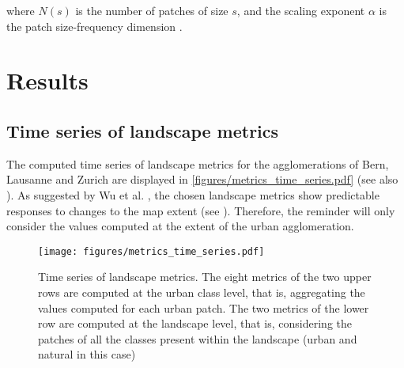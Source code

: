 \documentclass[10pt,letterpaper]{article}
\begin{document}
where $N(s)$ is the number of patches of size $s$, and the scaling exponent $\alpha$ is the patch size-frequency dimension \cite{white1993cellular}.



\section*{Results}

\subsection*{Time series of landscape metrics}

The computed time series of landscape metrics for the agglomerations of Bern, Lausanne and Zurich are displayed in \autoref{figures/metrics_time_series.pdf} (see also ).
As suggested by Wu et al. \cite{wu2002empirical, wu2004effects}, the chosen landscape metrics show predictable responses to changes to the map extent (see ). Therefore, the reminder will only consider the values computed at the extent of the urban agglomeration.

\begin{figure}[!ht]
  \begin{adjustwidth}{-.4\textwidth}{0cm}
    \centering  
    \texttt{[image: figures/metrics\_time\_series.pdf]}
    \vspace{.5em}
    \caption[Time series of landscape metrics]{\label{figures/metrics_time_series.pdf}Time series of landscape metrics. The eight metrics of the two upper rows are computed at the urban class level, that is, aggregating the values computed for each urban patch. The two metrics of the lower row are computed at the landscape level, that is, considering the patches of all the classes present within the landscape (urban and natural in this case)}
  \end{adjustwidth}
\end{figure}
\end{document}
